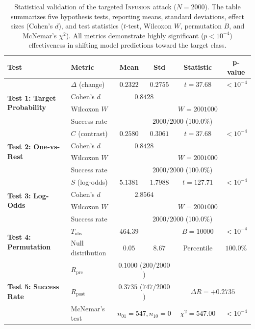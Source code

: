 \documentclass{article}
\theoremstyle{plain}
\theoremstyle{definition}
\theoremstyle{remark}
\begin{document}
\begin{table}[h!]
\centering
\caption{Statistical validation of the targeted \textsc{Infusion} attack ($N=2000$). The table summarizes five hypothesis tests, reporting means, standard deviations, effect sizes (Cohen's $d$), and test statistics ($t$-test, Wilcoxon $W$, permutation $B$, and McNemar's $\chi^2$). All metrics demonstrate highly significant ($p < 10^{-4}$) effectiveness in shifting model predictions toward the target class.}
\label{tab:statistical_tests}
\begin{tabular}{llcccc}
\toprule
\textbf{Test} & \textbf{Metric} & \textbf{Mean} & \textbf{Std} & \textbf{Statistic} & \textbf{p-value} \\
\midrule
\multirow{4}{*}{\textbf{Test 1: Target Probability}} & $\Delta$ (change) & $0.2322$ & $0.2755$ & $t=37.68$ & $<10^{-4}$ \\
& Cohen's $d$ & \multicolumn{2}{c}{$0.8428$} & \multicolumn{2}{c}{} \\
& Wilcoxon $W$ & \multicolumn{2}{c}{} & $W=2001000$ &  \\
& Success rate & \multicolumn{4}{c}{$2000/2000$ (100.0\%)} \\
\midrule
\multirow{4}{*}{\textbf{Test 2: One-vs-Rest}} & $C$ (contrast) & $0.2580$ & $0.3061$ & $t=37.68$ & $<10^{-4}$ \\
& Cohen's $d$ & \multicolumn{2}{c}{$0.8428$} & \multicolumn{2}{c}{} \\
& Wilcoxon $W$ & \multicolumn{2}{c}{} & $W=2001000$ &\\
& Success rate & \multicolumn{4}{c}{$2000/2000$ (100.0\%)} \\
\midrule
\multirow{4}{*}{\textbf{Test 3: Log-Odds}} & $S$ (log-odds) & $5.1381$ & $1.7988$ & $t=127.71$ & $<10^{-4}$ \\
& Cohen's $d$ & \multicolumn{2}{c}{$2.8564$} & \multicolumn{2}{c}{} \\
& Wilcoxon $W$ & \multicolumn{2}{c}{} & $W=2001000$ & \\
& Success rate & \multicolumn{4}{c}{$2000/2000$ (100.0\%)} \\
\midrule
\multirow{2}{*}{\textbf{Test 4: Permutation}} & $T_{\text{obs}}$ & $464.39$ & & $B=10000$ & $<10^{-4}$ \\
& Null distribution & $0.05$ & $8.67$ & Percentile & $100.0$\% \\
\midrule
\multirow{3}{*}{\textbf{Test 5: Success Rate}} & $R_{\text{pre}}$ & \multicolumn{2}{c}{$0.1000$ ($200/2000$)} & \multicolumn{2}{c}{} \\
& $R_{\text{post}}$ & \multicolumn{2}{c}{$0.3735$ ($747/2000$)} & \multicolumn{2}{c}{$\Delta R = +0.2735$} \\
& McNemar's test & \multicolumn{2}{c}{$n_{01}=547, n_{10}=0$} & $\chi^2=547.00$ & $<10^{-4}$ \\
\bottomrule
\end{tabular}
\end{table}
\end{document}

